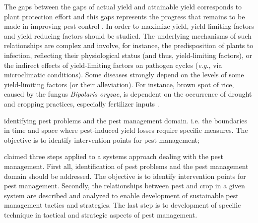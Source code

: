 The gaps between the gaps of actual yield and attainable yield corresponds to plant protection effort and this gaps represents the progress that remains to be made in improving pest control \citep{OERKE:2006ct}. In order to maximize yield, yield limiting factors and yield reducing factors should be studied. The underlying mechanisms of such relationships are complex \citep{Zadoks:1979ts} and involve, for instance, the predisposition of plants to infection, reflecting their physiological status (and thus, yield-limiting factors), or the indirect effects of yield-limiting factors on pathogen cycles (\textit{e.g.}, via microclimatic conditions). Some diseases strongly depend on the levels of some yield-limiting factors (or their alleviation). For instance, brown spot of rice, caused by the fungus \textit{Bipolaris oryzae}, is dependent on the occurrence of drought and cropping practices, especially fertilizer inputs \citep{barnwal2013review}.






identifying pest problems and the pest management domain. i.e. the boundaries in time and space where pest-induced yield losses require specific measures. The objective is to identify intervention points for pest management;

\citet{teng1992implementing} claimed three steps applied to a systems approach dealing with the pest management. First all, identification of pest problems and the pest management domain should be addressed. The objective is to identify intervention points for pest management. Secondly, the relationships between pest and crop in a given system are described and analyzed to enable development of sustainable pest management tactics and strategies. The last step is to development of specific technique in tactical and strategic aspects of pest management.

